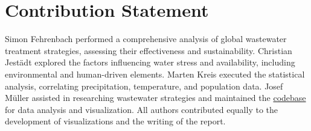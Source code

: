 \documentclass{article}
\theoremstyle{plain}
\theoremstyle{definition}
\theoremstyle{remark}
\begin{document}
\section*{Contribution Statement}

Simon Fehrenbach performed a comprehensive analysis of global wastewater treatment strategies, assessing their effectiveness and sustainability.
Christian Jestädt explored the factors influencing water stress and availability, including environmental and human-driven elements.
Marten Kreis executed the statistical analysis, correlating precipitation, temperature, and population data.
Josef Müller assisted in researching wastewater strategies and maintained the \href{https://github.com/am9zZWY/team-aqua}{codebase} for data analysis and visualization.
All authors contributed equally to the development of visualizations and the writing of the report.


\end{document}
